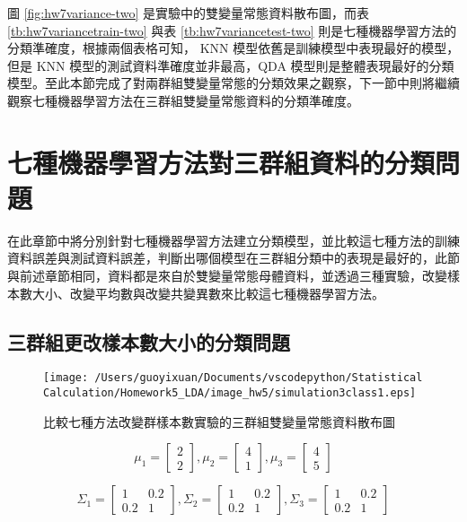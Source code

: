 圖 \ref{fig:hw7variance-two} 是實驗中的雙變量常態資料散布圖，而表 \ref{tb:hw7variancetrain-two} 與表 \ref{tb:hw7variancetest-two} 則是七種機器學習方法的分類準確度，根據兩個表格可知， KNN 模型依舊是訓練模型中表現最好的模型，但是 KNN 模型的測試資料準確度並非最高，QDA 模型則是整體表現最好的分類模型。至此本節完成了對兩群組雙變量常態的分類效果之觀察，下一節中則將繼續觀察七種機器學習方法在三群組雙變量常態資料的分類準確度。

\section{七種機器學習方法對三群組資料的分類問題}

在此章節中將分別針對七種機器學習方法建立分類模型，並比較這七種方法的訓練資料誤差與測試資料誤差，判斷出哪個模型在三群組分類中的表現是最好的，此節與前述章節相同，資料都是來自於雙變量常態母體資料，並透過三種實驗，改變樣本數大小、改變平均數與改變共變異數來比較這七種機器學習方法。

\subsection{三群組更改樣本數大小的分類問題}


\begin{figure}[H]
    \centering
        \texttt{[image: /Users/guoyixuan/Documents/vscodepython/Statistical Calculation/Homework5\_LDA/image\_hw5/simulation3class1.eps]}
    \caption{比較七種方法改變群樣本數實驗的三群組雙變量常態資料散布圖}
    \label{fig:hw7sample-three}
\end{figure} 

$$ \mu_1 = \left[
            \begin{array}{clr}
                2  \\
                2 
            \end{array} \right] ,
            \mu_2 = \left[
            \begin{array}{clr}
                4  \\
                1 
            \end{array} \right],
            \mu_3 = \left[
            \begin{array}{clr}
                4  \\
                5 
            \end{array} \right]$$ 

$$ \Sigma_1 = \left[
            \begin{array}{clr}
                1 & 0.2  \\
                0.2 & 1
            \end{array} \right] ,
            \Sigma_2 = \left[
            \begin{array}{clr}
                1 & 0.2  \\
                0.2 & 1 
            \end{array} \right]  ,
            \Sigma_3 = \left[
            \begin{array}{clr}
                1 & 0.2  \\
                0.2 & 1 
            \end{array} \right] $$

